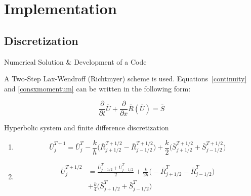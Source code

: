 \documentclass{beamer}
\newcommand{\partder}[2]{\frac{\partial #1}{\partial #2}}
\newcommand{\tensor}[1]{\bar{#1}}
\newcommand{\tensplus}[3]{\tensor{#1}_{#2}^{#3}}
\begin{document}
\section{Implementation}
\subsection{Discretization}

\begin{frame}{Numerical Solution $\&$ Development of a Code}
		\begin{block}
		A Two-Step Lax-Wendroff (Richtmyer) scheme is used. Equations~\ref{continuity} and \ref{consxmomentum} can be written in the following form:

		\begin{equation} 
			\label{discrete1}
			\partder{}{t} \tensor{U} + \partder{}{x} \tensor{R}(\tensor{U}) = \tensor{S}
		\end{equation}
		\end{block}
\end{frame}


\begin{frame}{Hyperbolic system and finite difference discretization}

\begin{enumerate}
	\item
	\begin{equation}
		\label{bigu1}
		\tensplus{U}{j}{T+1} = \tensplus{U}{j}{T} - \frac{k}{h} \Bigg(\tensplus{R}{j+1/2}{T+1/2} - \tensplus{R}{j-1/2}{T+1/2} \Bigg) + \frac{k}{2} \Bigg(\tensplus{S}{j		+1/2}{T+1/2} + \tensplus{S}{j-1/2}{T+1/2} \Bigg)
	\end{equation}
	
	\item
		\begin{align*}
		\tensplus{U}{j}{T+1/2} &= \frac{\tensplus{U}{j+1/2}{T} + \tensplus{U}{j-1/2}{T}}{2} + \frac{k}{2h} \Bigg(-\tensplus{R}{j+1/2}{T} - \tensplus{R}{j-1/2}{T} \Bigg)\\ 		&+ \frac{k}{4} \Bigg(\tensplus{S}{j+1/2}{T} + \tensplus{S}{j-1/2}{T} \Bigg)
		\end{align*}
\end{enumerate}

\end{frame}

\end{document}
